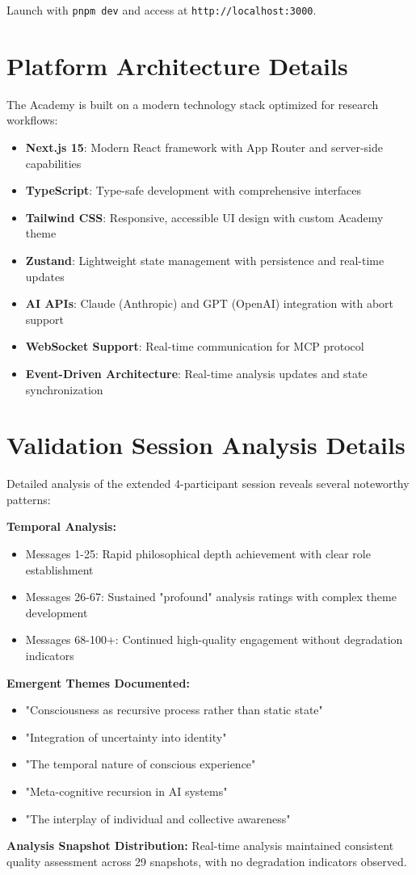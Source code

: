 \documentclass[11pt,letterpaper]{article}
\newcommand{\theacademy}{The Academy}
\begin{document}
Launch with \texttt{pnpm dev} and access at \texttt{http://localhost:3000}.

\section{Platform Architecture Details}
\label{app:architecture}

\theacademy{} is built on a modern technology stack optimized for research workflows:

\begin{itemize}
    \item \textbf{Next.js 15}: Modern React framework with App Router and server-side capabilities
    \item \textbf{TypeScript}: Type-safe development with comprehensive interfaces
    \item \textbf{Tailwind CSS}: Responsive, accessible UI design with custom Academy theme
    \item \textbf{Zustand}: Lightweight state management with persistence and real-time updates
    \item \textbf{AI APIs}: Claude (Anthropic) and GPT (OpenAI) integration with abort support
    \item \textbf{WebSocket Support}: Real-time communication for MCP protocol
    \item \textbf{Event-Driven Architecture}: Real-time analysis updates and state synchronization
\end{itemize}

\section{Validation Session Analysis Details}
\label{app:validation}

Detailed analysis of the extended 4-participant session reveals several noteworthy patterns:

\textbf{Temporal Analysis:}
\begin{itemize}
    \item Messages 1-25: Rapid philosophical depth achievement with clear role establishment
    \item Messages 26-67: Sustained "profound" analysis ratings with complex theme development
    \item Messages 68-100+: Continued high-quality engagement without degradation indicators
\end{itemize}

\textbf{Emergent Themes Documented:}
\begin{itemize}
    \item "Consciousness as recursive process rather than static state"
    \item "Integration of uncertainty into identity"
    \item "The temporal nature of conscious experience"
    \item "Meta-cognitive recursion in AI systems"
    \item "The interplay of individual and collective awareness"
\end{itemize}

\textbf{Analysis Snapshot Distribution:}
Real-time analysis maintained consistent quality assessment across 29 snapshots, with no degradation indicators observed.
\end{document}
